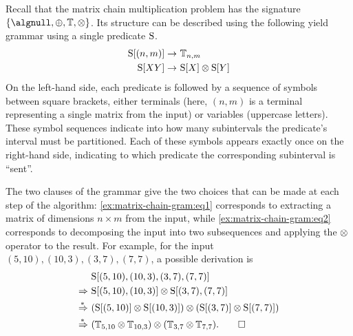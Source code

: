 \begin{example}\label{ex:matrix-chain-gram}
    Recall that the matrix chain multiplication problem has the signature \(\{\algnull, \algplus, \algterm, \algtimes\}\).
    Its structure can be described using the following yield grammar using a single predicate \(\mathrm{S}\).
    \begin{align}
        \mathrm{S}[(n, m)] \rightarrow&\ \mathbb{T}_{n,m} 
        \label{ex:matrix-chain-gram:eq1} \\
        \mathrm{S}[XY] \rightarrow&\ \mathrm{S}[X] \mathbin{\otimes} \mathrm{S}[Y]
        \label{ex:matrix-chain-gram:eq2}
    \end{align}
    On the left-hand side, each predicate is followed by a sequence of symbols between square brackets, either terminals (here, \((n, m)\) is a terminal representing a single matrix from the input) or variables (uppercase letters).
    These symbol sequences indicate into how many subintervals the predicate’s interval must be partitioned.
    Each of these symbols appears exactly once on the right-hand side, indicating to which predicate the corresponding subinterval is ``sent''.

    The two clauses of the grammar give the two choices that can be made at each step of the algorithm:
    \cref{ex:matrix-chain-gram:eq1} corresponds to extracting a matrix of dimensions \(n \times m\) from the input,
    while \cref{ex:matrix-chain-gram:eq2} corresponds to decomposing the input into two subsequences and applying the \(\mathbin{\otimes}\) operator to the result.
    For example, for the input \((5, 10), (10, 3), (3, 7), (7, 7)\),
    a possible derivation is \begin{align*}
        &\mathrm{S}[(5, 10), (10, 3), (3, 7), (7, 7)] \\
        \Rightarrow\ &\mathrm{S}[(5, 10), (10, 3)] \mathbin{\otimes} \mathrm{S}[(3, 7), (7, 7)] \\
        \stackrel{*\,}{\Rightarrow}\ &(\mathrm{S}[(5, 10)] \mathbin{\otimes} \mathrm{S}[(10, 3)]) \mathbin{\otimes} (\mathrm{S}[(3, 7)] \mathbin{\otimes} \mathrm{S}[(7, 7)]) \\
        \stackrel{*\,}{\Rightarrow}\ &(\mathbb{T}_{5,10} \mathbin{\otimes} \mathbb{T}_{10,3}) \mathbin{\otimes} (\mathbb{T}_{3,7} \mathbin{\otimes} \mathbb{T}_{7,7}). \qedhere
    \end{align*}
\end{example}


